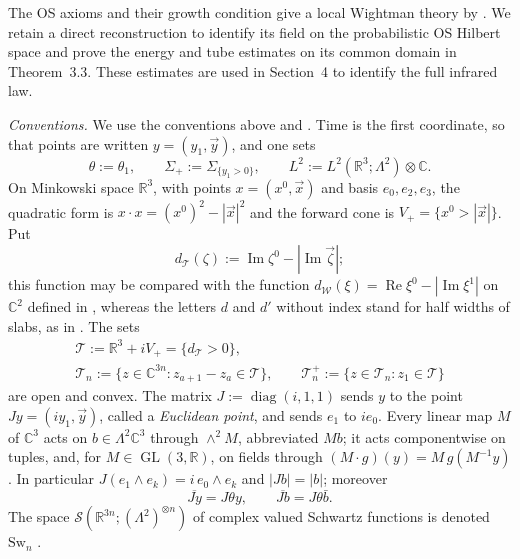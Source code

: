 \documentclass[11pt,letterpaper,reqno]{amsart}
\theoremstyle{definition}
\begin{document}
The OS axioms and their growth condition give a local Wightman theory
by \cite[Section~IV.1]{OS1975}. We retain a direct reconstruction to
identify its field on the probabilistic OS Hilbert space and prove
the energy and tube estimates on its common domain in Theorem~3.3. These
estimates are used in Section~4 to identify the full infrared law.

\emph{Conventions.}
We use the conventions above and \cite[(n1)--(n8)]{QEDIII}.
Time is the first coordinate, so that points are written $y=(y_1,\vec y)$, and one sets
\begin{equation*}
\theta:=\theta_1,\qquad \Sigma_+:=\Sigma_{\{y_1>0\}},\qquad L^2:=L^2(\mathbb R^3;\Lambda^2)\otimes\mathbb C.
\end{equation*}
On Minkowski space $\mathbb R^3$, with points $x=(x^0,\vec x)$ and basis $e_0,e_2,e_3$, the quadratic form is $x\cdot x=(x^0)^2-|\vec x|^2$ and the forward cone is $V_+=\{x^0>|\vec x|\}$.
Put
\begin{equation*}
d_{\mathcal T}(\zeta):=\operatorname{Im}\zeta^0-|\operatorname{Im}\vec\zeta|;
\end{equation*}
this function may be compared with the function $d_{\mathcal W}(\xi)=\allowbreak \operatorname{Re}\xi^0-|\operatorname{Im}\xi^1|$ on $\mathbb C^2$ defined in \cite[Section~14.2]{QEDII}, whereas the letters $d$ and $d'$ without index stand for half widths of slabs, as in \cite[Proposition~14.16]{QEDII}.
The sets
\begin{gather*}
\mathcal T:=\mathbb R^3+iV_+=\{d_{\mathcal T}>0\},\\
\mathcal T_n:=\{z\in\mathbb C^{3n}:z_{a+1}-z_a\in\mathcal T\},\qquad \mathcal T_n^+:=\{z\in\mathcal T_n:z_1\in\mathcal T\}
\end{gather*}
are open and convex.
The matrix $J:=\operatorname{diag}(i,1,1)$ sends $y$ to the point $Jy=(iy_1,\vec y)$, called a \emph{Euclidean point}, and sends $e_1$ to $ie_0$.
Every linear map $M$ of $\mathbb C^3$ acts on $b\in\Lambda^2\mathbb C^3$ through $\wedge^2M$, abbreviated $Mb$; it acts componentwise on tuples, and, for $M\in\operatorname{GL}(3,\mathbb R)$, on fields through $(M\cdot g)(y)=M\,g(M^{-1}y)$.
In particular $J(e_1\wedge e_k)=i\,e_0\wedge e_k$ and $|Jb|=|b|$; moreover
\begin{equation}
\overline{Jy}=J\theta y,\qquad \overline{Jb}=J\theta\bar b.
\tag{K}
\end{equation}
The space $\mathcal S(\mathbb R^{3n};(\Lambda^2)^{\otimes n})$ of complex valued Schwartz functions is denoted $\mathrm{Sw}_n$ \cite[(n5)]{QEDIII}.
\end{document}
